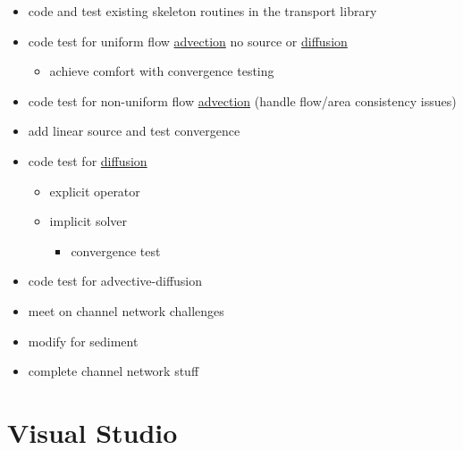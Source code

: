 \begin{enumerate}
\begin{itemize}
\item code and test existing skeleton routines in the transport library\item code test for uniform flow \hyperlink{a00052}{advection} no source or \hyperlink{a00056}{diffusion}\begin{itemize}
\item achieve comfort with convergence testing\end{itemize}
\item code test for non-uniform flow \hyperlink{a00052}{advection} (handle flow/area consistency issues)\item add linear source and test convergence\item code test for \hyperlink{a00056}{diffusion}\begin{itemize}
\item explicit operator\item implicit solver\begin{itemize}
\item convergence test\end{itemize}
\end{itemize}
\item code test for advective-diffusion\item meet on channel network challenges\item modify for sediment\item complete channel network stuff\end{itemize}
\end{enumerate}
\hypertarget{index_viz}{}\section{Visual Studio}\label{index_viz}
